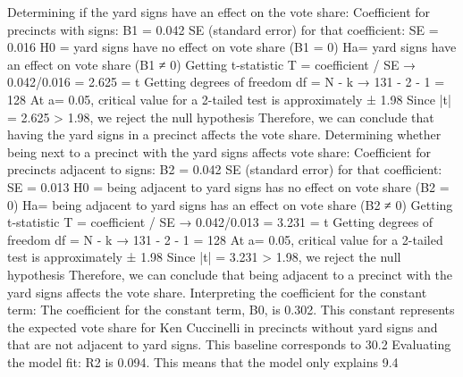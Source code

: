 Determining if the yard signs have an effect on the vote share:
Coefficient for precincts with signs: B1 = 0.042
SE (standard error) for that coefficient: SE = 0.016
H0 = yard signs have no effect on vote share (B1 = 0)
Ha= yard signs have an effect on vote share (B1 ≠ 0)
Getting t-statistic
T = coefficient / SE → 0.042/0.016 = 2.625 = t
Getting degrees of freedom
df = N - k → 131 - 2 - 1 = 128
At a= 0.05, critical value for a 2-tailed test is approximately ± 1.98
Since |t| = 2.625 > 1.98, we reject the null hypothesis
Therefore, we can conclude that having the yard signs in a precinct affects the vote share. 
Determining whether being next to a precinct with the yard signs affects vote share:
Coefficient for precincts adjacent to signs: B2 = 0.042
SE (standard error) for that coefficient: SE = 0.013
H0 = being adjacent to yard signs has no effect on vote share (B2 = 0)
Ha= being adjacent to yard signs has an effect on vote share (B2 ≠ 0)
Getting t-statistic
T = coefficient / SE → 0.042/0.013 = 3.231 = t
Getting degrees of freedom
df = N - k → 131 - 2 - 1 = 128
At a= 0.05, critical value for a 2-tailed test is approximately ± 1.98
Since |t| = 3.231 > 1.98, we reject the null hypothesis
Therefore, we can conclude that being adjacent to a precinct with the yard signs affects the vote share. 
Interpreting the coefficient for the constant term:
The coefficient for the constant term, B0, is 0.302. This constant represents the expected vote share for Ken Cuccinelli in precincts without yard signs and that are not adjacent to yard signs. This baseline corresponds to 30.2%
Evaluating the model fit:
R2 is 0.094. This means that the model only explains 9.4%


